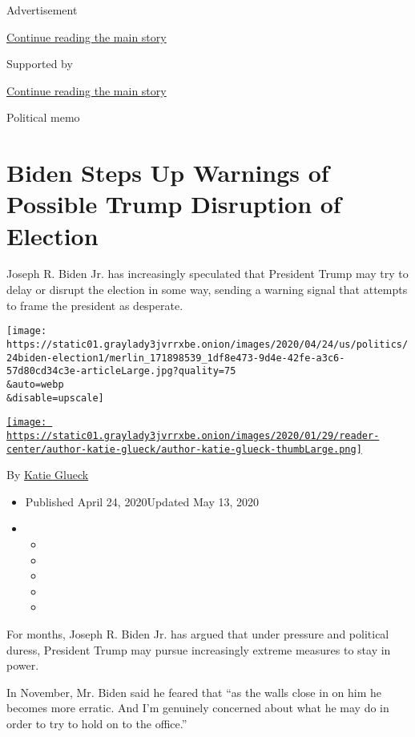 Advertisement

\protect\hyperlink{after-top}{Continue reading the main story}

Supported by

\protect\hyperlink{after-sponsor}{Continue reading the main story}

Political memo

\hypertarget{biden-steps-up-warnings-of-possible-trump-disruption-of-election}{%
\section{Biden Steps Up Warnings of Possible Trump Disruption of
Election}\label{biden-steps-up-warnings-of-possible-trump-disruption-of-election}}

Joseph R. Biden Jr. has increasingly speculated that President Trump may
try to delay or disrupt the election in some way, sending a warning
signal that attempts to frame the president as desperate.

\texttt{[image: https://static01.graylady3jvrrxbe.onion/images/2020/04/24/us/politics/24biden-election1/merlin\_171898539\_1df8e473-9d4e-42fe-a3c6-57d80cd34c3e-articleLarge.jpg?quality=75\\\&auto=webp\\\&disable=upscale]}

\href{https://www.nytimes3xbfgragh.onion/by/katie-glueck}{\texttt{[image: https://static01.graylady3jvrrxbe.onion/images/2020/01/29/reader-center/author-katie-glueck/author-katie-glueck-thumbLarge.png]}}

By \href{https://www.nytimes3xbfgragh.onion/by/katie-glueck}{Katie
Glueck}

\begin{itemize}
\item
  Published April 24, 2020Updated May 13, 2020
\item
  \begin{itemize}
  \item
  \item
  \item
  \item
  \item
  \end{itemize}
\end{itemize}

For months, Joseph R. Biden Jr. has argued that under pressure and
political duress, President Trump may pursue increasingly extreme
measures to stay in power.

In November, Mr. Biden said he feared that ``as the walls close in on
him he becomes more erratic. And I'm genuinely concerned about what he
may do in order to try to hold on to the office.''


